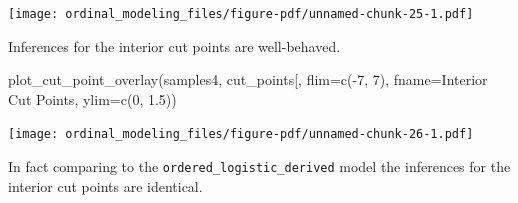 \documentclass[
  letterpaper,
  DIV=11,
  numbers=noendperiod]{scrartcl}
\newenvironment{Shaded}{\begin{snugshade}}{\end{snugshade}}
\newcommand{\AttributeTok}[1]{\textcolor[rgb]{0.40,0.45,0.13}{#1}}
\newcommand{\DecValTok}[1]{\textcolor[rgb]{0.68,0.00,0.00}{#1}}
\newcommand{\FloatTok}[1]{\textcolor[rgb]{0.68,0.00,0.00}{#1}}
\newcommand{\FunctionTok}[1]{\textcolor[rgb]{0.28,0.35,0.67}{#1}}
\newcommand{\NormalTok}[1]{\textcolor[rgb]{0.00,0.23,0.31}{#1}}
\newcommand{\SpecialCharTok}[1]{\textcolor[rgb]{0.37,0.37,0.37}{#1}}
\newcommand{\StringTok}[1]{\textcolor[rgb]{0.13,0.47,0.30}{#1}}
\begin{document}
\texttt{[image: ordinal\_modeling\_files/figure-pdf/unnamed-chunk-25-1.pdf]}

Inferences for the interior cut points are well-behaved.

\begin{Shaded}
\begin{Highlighting}[]
\FunctionTok{plot\_cut\_point\_overlay}\NormalTok{(samples4, }\StringTok{\textquotesingle{}cut\_points[\textquotesingle{}}\NormalTok{,}
                       \AttributeTok{flim=}\FunctionTok{c}\NormalTok{(}\SpecialCharTok{{-}}\DecValTok{7}\NormalTok{, }\DecValTok{7}\NormalTok{), }\AttributeTok{fname=}\StringTok{\textquotesingle{}Interior Cut Points\textquotesingle{}}\NormalTok{,}
                       \AttributeTok{ylim=}\FunctionTok{c}\NormalTok{(}\DecValTok{0}\NormalTok{, }\FloatTok{1.5}\NormalTok{))}
\end{Highlighting}
\end{Shaded}

\texttt{[image: ordinal\_modeling\_files/figure-pdf/unnamed-chunk-26-1.pdf]}

In fact comparing to the \texttt{ordered\_logistic\_derived} model the
inferences for the interior cut points are identical.
\end{document}
